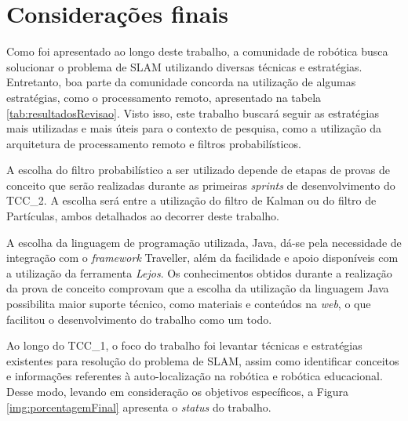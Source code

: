 \chapter[Considerações finais]{Considerações finais}

Como foi apresentado ao longo deste trabalho, a comunidade de robótica busca solucionar o problema de SLAM utilizando diversas técnicas e estratégias. Entretanto, boa parte da comunidade concorda na utilização de algumas estratégias, como o processamento remoto, apresentado na tabela \ref{tab:resultadosRevisao}. Visto isso, este trabalho buscará seguir as estratégias mais utilizadas e mais úteis para o contexto de pesquisa, como a utilização da arquitetura de processamento remoto e filtros probabilísticos.

A escolha do filtro probabilístico a ser utilizado depende de etapas de provas de conceito que serão realizadas durante as primeiras \textit{sprints} de desenvolvimento do TCC\_2. A escolha será entre a utilização do filtro de Kalman ou do filtro de Partículas, ambos detalhados ao decorrer deste trabalho.

A escolha da linguagem de programação utilizada, Java, dá-se pela necessidade de integração com o \textit{framework} Traveller, além da facilidade e apoio disponíveis com a utilização da ferramenta \textit{Lejos}. Os conhecimentos obtidos durante a realização da prova de conceito comprovam que a escolha da utilização da linguagem Java possibilita maior suporte técnico, como materiais e conteúdos na \textit{web}, o que facilitou o desenvolvimento do trabalho como um todo.

Ao longo do TCC\_1, o foco do trabalho foi levantar técnicas e estratégias existentes para resolução do problema de SLAM, assim como identificar conceitos e informações referentes à auto-localização na robótica e robótica educacional. Desse modo, levando em consideração os objetivos específicos, a Figura \ref{img:porcentagemFinal} apresenta o \textit{status} do trabalho.

